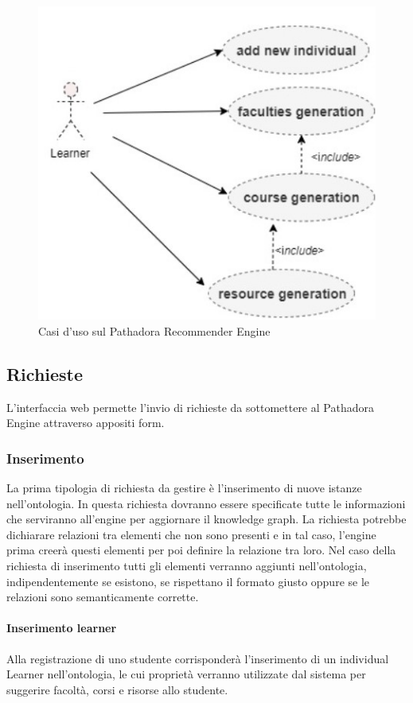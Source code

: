 \begin{figure}[H]
\centering
\includegraphics[scale=0.4]{res/pathadora-engine.jpg}
\caption{Casi d'uso sul Pathadora Recommender Engine}
\label{fig:pathadora-engine}
\end{figure}

\subsection{Richieste}
L'interfaccia web permette l'invio di richieste da sottomettere al Pathadora Engine attraverso appositi form.

\subsubsection{Inserimento}
La prima tipologia di richiesta da gestire è l’inserimento di nuove istanze nell'ontologia. In questa richiesta dovranno essere specificate tutte le informazioni che serviranno all’engine per aggiornare il knowledge graph. La richiesta potrebbe dichiarare relazioni tra elementi che non sono presenti e in tal caso, l’engine prima creerà questi elementi per poi definire la relazione tra
loro. Nel caso della richiesta di inserimento tutti gli elementi verranno aggiunti nell’ontologia, indipendentemente se esistono, se rispettano il formato giusto oppure se le relazioni sono semanticamente corrette.

\paragraph{Inserimento learner}
Alla registrazione di uno studente corrisponderà l'inserimento di un individual Learner nell'ontologia, le cui proprietà verranno utilizzate dal sistema per suggerire facoltà, corsi e risorse allo studente.

